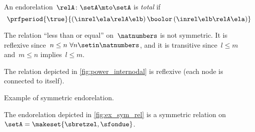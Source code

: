 \begin{ctdefinition}
    \label{def:endo_total}
    An endorelation~$\relA\colon \setA\mto \setA$ is \emph{total} if
    \begin{equation}\label{eq:total}
        \prfperiod{
            \true
        }{
            (\inrel\ela\relA\elb )\,\boolor\, (\inrel\elb\relA\ela)
        }
    \end{equation}
\end{ctdefinition}

\begin{example}
    The relation ``less than or equal'' on~$\natnumbers$ is not symmetric.
    It is reflexive since~$n\leq n \ \forall n\setin \natnumbers$, and it is transitive since~$l\leq m$ and~$m\leq n$ implies~$l\leq m$.
\end{example}

\begin{example}
    The relation depicted in \vref{fig:power_internodal} is reflexive (each node is connected to itself).
\end{example}
\begin{marginfigure}
    \centering
    \caption{Example of symmetric endorelation.}
    \label{fig:ex_sym_rel}
\end{marginfigure}
\begin{example}
    The endorelation depicted in \vref{fig:ex_sym_rel} is a symmetric relation on~$\setA=\makeset{\sbretzel,\sfondue}$.
\end{example}

